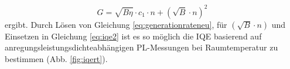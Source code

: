 \begin{equation}
    G = \sqrt{B \eta} \cdot c_1\cdot n + (\sqrt{B} \cdot n)^2
    \label{eq:generationrateneu}
\end{equation}  
ergibt. 
Durch Lösen von Gleichung \ref{eq:generationrateneu}, für $(\sqrt{B} \cdot n)$ und Einsetzen in Gleichung \ref{eq:iqe2} ist es so möglich die IQE basierend auf anregungsleistungsdichteabhängigen PL-Messungen bei Raumtemperatur zu bestimmen (Abb. \ref{fig:iqert}).



